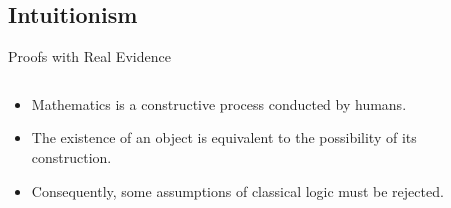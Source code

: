 \documentclass{beamer}
\begin{document}
\subsection{Intuitionism}
\begin{frame}{Proofs with Real Evidence}
	\vspace{\baselineskip}
	\begin{columns}[T,onlytextwidth]
	 \begin{column}{.65\textwidth}
	    \begin{itemize}
		\item<1-> Mathematics is a constructive process conducted by humans.
		\item<3-> The existence of an object is equivalent to the possibility of its construction.
		\item<4-> Consequently, some assumptions of classical logic must be rejected.
	    \end{itemize}
	 \end{column}
	 \begin{column}{.3\textwidth}
		\centering

\end{column}
\end{columns}
\end{frame}
\end{document}
